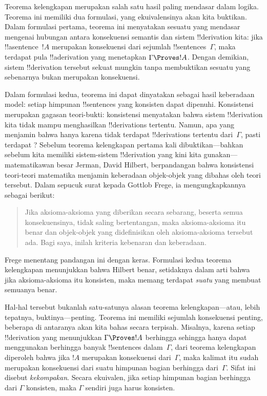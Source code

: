 \documentclass[../../../include/open-logic-section]{subfiles}
\begin{document}
      {}
      {}


Teorema kelengkapan merupakan salah satu hasil paling mendasar dalam
logika. Teorema ini memiliki dua formulasi, yang ekuivalensinya akan
kita buktikan. Dalam formulasi pertama, teorema ini menyatakan sesuatu
yang mendasar mengenai hubungan antara konsekuensi semantis dan sistem
!!{derivation} kita: jika !!a{sentence}~$!A$ merupakan konsekuensi dari
sejumlah !!{sentence}s~$\Gamma$, maka terdapat pula !!a{derivation} yang
menetapkan $\Gamma \Proves !A$. Dengan demikian, sistem !!{derivation}
tersebut sekuat mungkin tanpa membuktikan sesuatu yang sebenarnya bukan
merupakan konsekuensi.

Dalam formulasi kedua, teorema ini dapat dinyatakan sebagai hasil
keberadaan model: setiap himpunan !!{sentence}s yang konsisten dapat
dipenuhi. Konsistensi merupakan gagasan teori-bukti: konsistensi
menyatakan bahwa sistem !!{derivation} kita tidak mampu menghasilkan
!!{derivation}s tertentu. Namun, apa yang menjamin bahwa hanya karena
tidak terdapat !!{derivation}s tertentu dari~$\Gamma$, pasti terdapat
? Sebelum teorema
kelengkapan pertama kali dibuktikan---bahkan sebelum kita memiliki
sistem-sistem !!{derivation} yang kini kita gunakan---matematikawan besar
Jerman, David Hilbert, berpandangan bahwa konsistensi teori-teori
matematika menjamin keberadaan objek-objek yang dibahas oleh teori
tersebut. Dalam sepucuk surat kepada Gottlob Frege, ia mengungkapkannya
sebagai berikut:
\begin{quote}
  Jika aksioma-aksioma yang diberikan secara sebarang, beserta semua
  konsekuensinya, tidak saling bertentangan, maka aksioma-aksioma itu
  benar dan objek-objek yang didefinisikan oleh aksioma-aksioma tersebut
  ada. Bagi saya, inilah kriteria kebenaran dan keberadaan.
\end{quote}
Frege menentang pandangan ini dengan keras. Formulasi kedua teorema
kelengkapan menunjukkan bahwa Hilbert benar, setidaknya dalam arti bahwa
jika aksioma-aksioma itu konsisten, maka memang terdapat
\emph{suatu}  yang membuat
semuanya benar.

Hal-hal tersebut bukanlah satu-satunya alasan teorema kelengkapan---atau,
lebih tepatnya, buktinya---penting. Teorema ini memiliki sejumlah
konsekuensi penting, beberapa di antaranya akan kita bahas secara
terpisah. Misalnya, karena setiap !!{derivation} yang menunjukkan
$\Gamma \Proves !A$ berhingga sehingga hanya dapat menggunakan berhingga
banyak !!{sentence}s dalam~$\Gamma$, dari teorema kelengkapan diperoleh
bahwa jika $!A$ merupakan konsekuensi dari~$\Gamma$, maka kalimat itu
sudah merupakan konsekuensi dari suatu himpunan bagian berhingga
dari~$\Gamma$. Sifat ini disebut \emph{kekompakan}. Secara ekuivalen,
jika setiap himpunan bagian berhingga dari $\Gamma$ konsisten, maka
$\Gamma$ sendiri juga harus konsisten.
\end{document}
